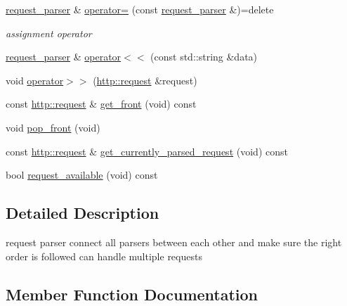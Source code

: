 \begin{DoxyCompactItemize}
\hyperlink{classnetflex_1_1parsing_1_1request__parser}{request\+\_\+parser} \& \hyperlink{classnetflex_1_1parsing_1_1request__parser_ae767b927e82531e4cd8b1581cf9c391b}{operator=} (const \hyperlink{classnetflex_1_1parsing_1_1request__parser}{request\+\_\+parser} \&)=delete
\begin{DoxyCompactList}\small\item\em assignment operator \end{DoxyCompactList}\item 
\hyperlink{classnetflex_1_1parsing_1_1request__parser}{request\+\_\+parser} \& \hyperlink{classnetflex_1_1parsing_1_1request__parser_a812651cbfdbff54e025fe131563de818}{operator$<$$<$} (const std\+::string \&data)
\item 
void \hyperlink{classnetflex_1_1parsing_1_1request__parser_a04e1c01d3e1dfa09df931bfb0c866e07}{operator$>$$>$} (\hyperlink{classnetflex_1_1http_1_1request}{http\+::request} \&request)
\item 
const \hyperlink{classnetflex_1_1http_1_1request}{http\+::request} \& \hyperlink{classnetflex_1_1parsing_1_1request__parser_a922495ec5c2ac20be2f8495ec1b06217}{get\+\_\+front} (void) const
\item 
void \hyperlink{classnetflex_1_1parsing_1_1request__parser_abd61692d9c98b6d02733afcd9b5fe5ce}{pop\+\_\+front} (void)
\item 
const \hyperlink{classnetflex_1_1http_1_1request}{http\+::request} \& \hyperlink{classnetflex_1_1parsing_1_1request__parser_a7ca420f9a3451b2e631fa5f3394f096a}{get\+\_\+currently\+\_\+parsed\+\_\+request} (void) const
\item 
bool \hyperlink{classnetflex_1_1parsing_1_1request__parser_aa0918393e460b72dec336ee75db7e2eb}{request\+\_\+available} (void) const
\end{DoxyCompactItemize}


\subsection{Detailed Description}
request parser connect all parsers between each other and make sure the right order is followed can handle multiple requests 

\subsection{Member Function Documentation}
\mbox{\label{classnetflex_1_1parsing_1_1request__parser_a7ca420f9a3451b2e631fa5f3394f096a}} 
